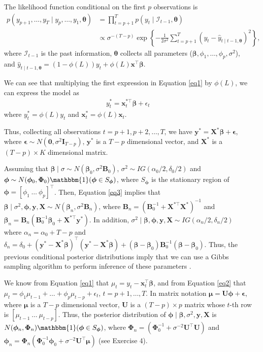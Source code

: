 The likelihood function conditional on the first $p$ observations is
\begin{align*}
	p(y_{p+1},\dots,y_T\mid y_{p},\dots,y_1,\bm{\theta})&=\prod_{t=p+1}^{T}p(y_t\mid \mathcal{I}_{t-1},\bm{\theta})\\
	&\propto \sigma^{-(T-p)}\exp\left\{-\frac{1}{2\sigma^2}\sum_{t=p+1}^T(y_t-\hat{y}_{t\mid t-1,\bm{\theta}})^2\right\},
\end{align*} 
where $\mathcal{I}_{t-1}$ is the past information, $\bm{\theta}$ collects all parameters ($\bm{\beta}, \phi_1,\dots,\phi_p, \sigma^2$), and $\hat{y}_{t\mid t-1,\bm{\theta}}=(1-\phi(L))y_t+\phi(L)\bm{x}^{\top}\bm{\beta}$.

We can see that multiplying the first expression in Equation \ref{eq1} by $\phi(L)$, we can express the model as 
\begin{align}\label{eq3}
	y_t^*=\bm{x}_t^{*\top}\bm{\beta}+\epsilon_t
\end{align}
where $y_t^*=\phi(L)y_t$ and $\bm{x}_t^{*}=\phi(L)\bm{x}_t$.

Thus, collecting all observations $t=p+1,p+2,\dots,T$, we have $\bm{y}^*=\bm{X}^*\bm{\beta}+\bm{\epsilon}$, where $\bm{\epsilon}\sim N(\bm{0},\sigma^2\bm{I}_{T-p})$, $\bm{y}^*$ is a $T-p$ dimensional vector, and $\bm{X}^*$ is a $(T-p)\times K$ dimensional matrix.

Assuming that $\bm{\beta}\mid \sigma\sim N(\bm{\beta}_0,\sigma^2\bm{B}_0)$, $\sigma^2\sim IG(\alpha_0/2,\delta_0/2)$ and $\bm{\phi}\sim N(\bm{\phi}_0,\bm{\Phi}_0)\mathbbm{1}(\bm{\phi}\in S_{\bm{\phi}})$, where $S_{\bm{\phi}}$ is the stationary region of $\bm{\phi}=[\phi_1 \ \dots \ \phi_p]^{\top}$. Then, Equation \ref{eq3} implies that $\bm{\beta}\mid \sigma^2,\bm{\phi},\bm{y},\bm{X}\sim N(\bm{\beta}_n, \sigma^2{\bm{B}}_n)$, where $\bm{B}_n = (\bm{B}_0^{-1} + \bm{X}^{*\top}\bm{X}^{*})^{-1}$ and $\bm{\beta}_n = \bm{B}_n(\bm{B}_0^{-1}\bm{\beta}_0 + \bm{X}^{*\top}\bm{y}^{*})$. In addition, $\sigma^2\mid \bm{\beta},\bm{\phi},\bm{y},\bm{X}\sim IG(\alpha_n/2,\delta_n/2)$ where $\alpha_n=\alpha_0+T-p$ and $\delta_n=\delta_0+(\bm{y}^*-\bm{X}^{*}\bm{\beta})^{\top}(\bm{y}^*-\bm{X}^{*}\bm{\beta})+(\bm{\beta}-\bm{\beta}_0)\bm{B}_0^{-1}(\bm{\beta}-\bm{\beta}_0)$. Thus, the previous conditional posterior distributions imply that we can use a Gibbs sampling algorithm to perform inference of these parameters \cite{chib1993bayes}.

We know from Equation \ref{eq1} that $\mu_t=y_t-\bm{x}_t^{\top}\bm{\beta}$, and from Equation \ref{eq2} that $\mu_t=\phi_1\mu_{t-1}+\dots+\phi_p\mu_{t-p}+\epsilon_t$, $t=p+1,\dots,T$. In matrix notation $\bm{\mu}=\bm{U}\bm{\phi}+\bm{\epsilon}$, where $\bm{\mu}$ is a $T-p$ dimensional vector, $\bm{U}$ is a $(T-p)\times p$ matrix whose $t$-th row is $[\mu_{t-1} \ \dots \ \mu_{t-p}]$. Thus, the posterior distribution of $\bm{\phi}\mid \bm{\beta},\sigma^2,\bm{y},\bm{X}$ is $N(\bm{\phi}_n, \bm{\Phi}_n)\mathbbm{1}(\bm{\phi}\in S_{\bm{\phi}})$, where $\bm{\Phi}_n=(\bm{\Phi}_0^{-1}+\sigma^{-2}\bm{U}^{\top}\bm{U})$ and $\bm{\phi}_n=\bm{\Phi}_n(\bm{\Phi}_0^{-1}\bm{\phi}_0+\sigma^{-2}\bm{U}^{\top}\bm{\mu})$ (see Exercise 4).


